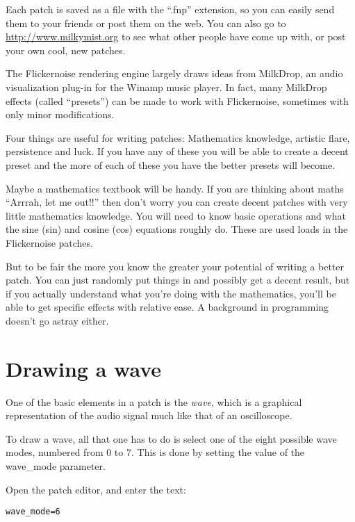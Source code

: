 \documentclass[11pt, a5paper, pagesize]{scrbook}
\begin{document}
Each patch is saved as a file with the ``.fnp'' extension, so you can easily send them to your friends or post them on the web. You can also go to \url{http://www.milkymist.org} to see what other people have come up with, or post your own cool, new patches.

The Flickernoise rendering engine largely draws ideas from MilkDrop, an audio visualization plug-in for the Winamp music player. In fact, many MilkDrop effects (called ``presets'') can be made to work with Flickernoise, sometimes with only minor modifications.

Four things are useful for writing patches: Mathematics knowledge, artistic flare, persistence and luck. If you have any of these you will be able to create a decent preset and the more of each of these you have the better presets will become. 

Maybe a mathematics textbook will be handy. If you are thinking about maths ``Arrrah, let me out!!'' then don't worry you can create decent patches with very little mathematics knowledge. You will need to know basic operations and what the sine (sin) and cosine (cos) equations roughly do. These are used loads in the Flickernoise patches.

But to be fair the more you know the greater your potential of writing a better patch. You can just randomly put things in and possibly get a decent result, but if you actually understand what you're doing with the mathematics, you'll be able to get specific effects with relative ease. A background in programming doesn't go astray either.

\section{Drawing a wave}
One of the basic elements in a patch is the \textit{wave}, which is a graphical representation of the audio signal much like that of an oscilloscope.

To draw a wave, all that one has to do is select one of the eight possible wave modes, numbered from 0 to 7. This is done by setting the value of the wave\_mode parameter.

Open the patch editor, and enter the text:

\begin{verbatim}
wave_mode=6
\end{verbatim}

\end{document}
